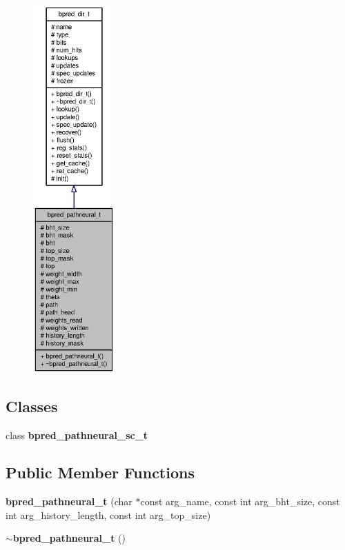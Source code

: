 \begin{figure}[H]
\begin{center}
\leavevmode
\includegraphics[height=400pt]{classbpred__pathneural__t__coll__graph}
\end{center}
\end{figure}
\subsection*{Classes}
\begin{CompactItemize}
\item 
class {\bf bpred\_\-pathneural\_\-sc\_\-t}
\end{CompactItemize}
\subsection*{Public Member Functions}
\begin{CompactItemize}
\item 
{\bf bpred\_\-pathneural\_\-t} (char $\ast$const arg\_\-name, const int arg\_\-bht\_\-size, const int arg\_\-history\_\-length, const int arg\_\-top\_\-size)
\item 
{\bf $\sim$bpred\_\-pathneural\_\-t} ()
\end{CompactItemize}
